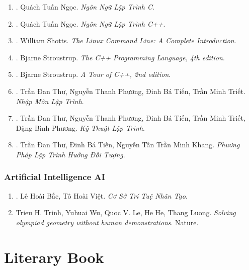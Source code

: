 \documentclass{article}
\begin{document}
\begin{enumerate}
	\item \cite{Ngoc_C}. Quách Tuấn Ngọc. {\it Ngôn Ngữ Lập Trình C}.\hfill{\sf[reading]}
	\item \cite{Ngoc_C++}. Quách Tuấn Ngọc. {\it Ngôn Ngữ Lập Trình C++}.\hfill{\sf[done]}
	\item \cite{Shotts2019}. William Shotts. {\it The Linux Command Line: A Complete Introduction}.\hfill{\sf[reading]}
	\item \cite{Stroustrup2013}. Bjarne Stroustrup. {\it The C++ Programming Language, 4th edition}.\hfill{\sf[reading]}
	\item \cite{Stroustrup2018}. Bjarne Stroustrup. {\it A Tour of C++, 2nd edition}.\hfill{\sf[reading]}
	\item \cite{Thu_Phuong_Tien_Triet_NMLT}. Trần Đan Thư, Nguyễn Thanh Phương, Đinh Bá Tiến, Trần Minh Triết. {\it Nhập Môn Lập Trình}.\hfill{\sf[reading]}
	\item \cite{Thu_Phuong_Tien_Triet_Phuong_KTLT}. Trần Đan Thư, Nguyễn Thanh Phương, Đinh Bá Tiến, Trần Minh Triết, Đặng Bình Phương. {\it Kỹ Thuật Lập Trình}.\hfill{\sf[reading]}
	\item \cite{Thu_Tien_Khang_PPLTHDT}. Trần Đan Thư, Đinh Bá Tiến, Nguyễn Tấn Trần Minh Khang. {\it Phương Pháp Lập Trình Hướng Đối Tượng}.\hfill{\sf[reading]}
\end{enumerate}

\subsubsection{Artificial Intelligence AI}

\begin{enumerate}
	\item \cite{Bac_Viet_AI}. Lê Hoài Bắc, Tô Hoài Việt. {\it Cơ Sở Trí Tuệ Nhân Tạo}.\hfill{\sf[done]}
	\item Trieu H. Trinh, Yuhuai Wu, Quoc V. Le, He He, Thang Luong. {\it Solving olympiad geometry without human demonstrations}. Nature.\hfill{\sf[reading]}
\end{enumerate}


\section{Literary Book}
\end{document}
